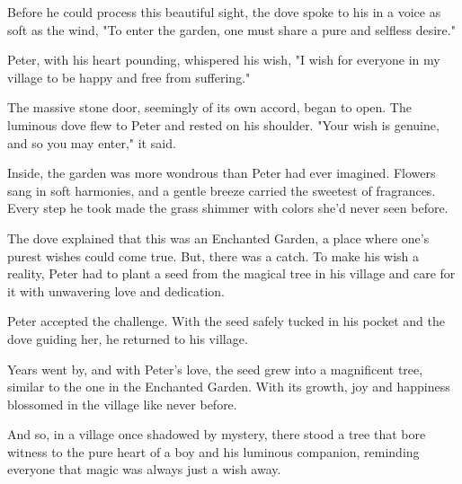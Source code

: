 \documentclass[10pt,fullpage, a4paper, titlepage]{article}
\begin{document}
Before he could process this beautiful sight, the dove spoke to his in a voice as soft as the wind, "To enter the garden, one must share a pure and selfless desire."

Peter, with his heart pounding, whispered his wish, "I wish for everyone in my village to be happy and free from suffering."

The massive stone door, seemingly of its own accord, began to open. The luminous dove flew to Peter and rested on his shoulder. "Your wish is genuine, and so you may enter," it said.

Inside, the garden was more wondrous than Peter had ever imagined. Flowers sang in soft harmonies, and a gentle breeze carried the sweetest of fragrances. Every step he took made the grass shimmer with colors she'd never seen before.

The dove explained that this was an Enchanted Garden, a place where one’s purest wishes could come true. But, there was a catch. To make his wish a reality, Peter had to plant a seed from the magical tree in his village and care for it with unwavering love and dedication.

Peter accepted the challenge. With the seed safely tucked in his pocket and the dove guiding her, he returned to his village.

Years went by, and with Peter's love, the seed grew into a magnificent tree, similar to the one in the Enchanted Garden. With its growth, joy and happiness blossomed in the village like never before.

And so, in a village once shadowed by mystery, there stood a tree that bore witness to the pure heart of a boy and his luminous companion, reminding everyone that magic was always just a wish away.
\end{document}
